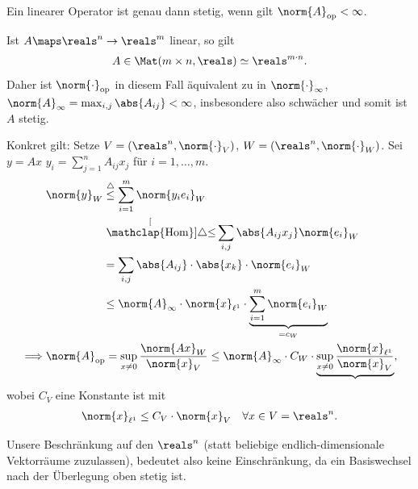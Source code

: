 \begin{bemerkung}
    Ein linearer Operator ist genau dann stetig, wenn gilt \( \norm{A}_{\text{op}}<\infty \).
\end{bemerkung}
\begin{beispiel*}
    Ist \( A\maps \reals^n \to \reals^m \) linear, so gilt 
    \begin{align*}
        A\in \Mat(m\times n,\reals)\simeq \reals^{m\cdot n}.
    \end{align*}
    Daher ist \( \norm{\cdot}_{\text{op}} \) in diesem Fall äquivalent zu in \( \norm{\cdot}_{\infty} \), \( \norm{A}_{\infty}=\max_{i,j}\abs{A_{ij}}<\infty \), insbesondere also schwächer und somit ist \( A \) stetig.

    Konkret gilt: Setze \( V=(\reals^n, \norm{\cdot}_{V}) \), \( W=(\reals^n,\norm{\cdot}_W) \).
    Sei \( y=Ax \) \timplies \( y_i=\sum_{j=1}^{n}A_{ij}x_j\) für \( i=1,\dotsc,m \).
    \begin{align*}
        &\norm{y}_{W}\begin{aligned}[t]
            &\overset{\triangle}{\leq}\sum_{i=1}^{m}\norm{y_i e_i}_{W}\\
            &\stackrel[\mathclap{\text{Hom}}]{\triangle}{\leq}\sum_{i,j}\abs{A_{ij}x_j}\norm{e_i}_{W}\\
            &=\sum_{i,j}\abs{A_{ij}}\cdot\abs{x_k}\cdot\norm{e_i}_{W}\\
            &\leq \norm{A}_{\infty}\cdot\norm{x}_{\ell^1}\cdot \underbrace{\sum_{i=1}^{m}\norm{e_i}_W}_{=c_W}
        \end{aligned}\\
        \implies &\norm{A}_{\text{op}}=\sup_{x\neq 0}\frac{\norm{Ax}_{W}}{\norm{x}_V}\leq \norm{A}_{\infty}\cdot C_W\cdot\underbrace{\sup_{x\neq 0}\frac{\norm{x}_{\ell^1}}{\norm{x}_V}},        
    \end{align*}
    wobei \( C_V \) eine Konstante ist mit
    \begin{align*}
        \norm{x}_{\ell^1}\leq C_V\cdot \norm{x}_V\quad \forall x\in V=\reals^n.
    \end{align*}
\end{beispiel*}
\begin{bemerkung*}
    Unsere Beschränkung auf den \( \reals^n \) (statt beliebige endlich-dimensionale Vektorräume zuzulassen), bedeutet also keine Einschränkung, da ein Basiswechsel nach der Überlegung oben stetig ist.
\end{bemerkung*}
